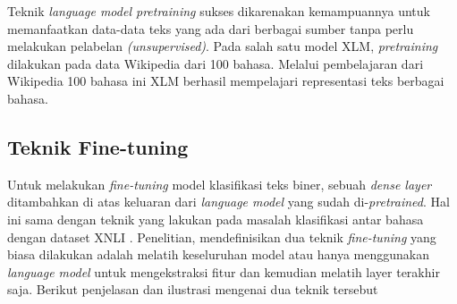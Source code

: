     Teknik \textit{language model pretraining} sukses dikarenakan kemampuannya untuk memanfaatkan data-data teks yang ada dari berbagai sumber tanpa perlu melakukan pelabelan \textit{(unsupervised)}. Pada salah satu model XLM, \textit{pretraining} dilakukan pada data Wikipedia dari 100 bahasa. Melalui pembelajaran dari Wikipedia 100 bahasa ini XLM berhasil mempelajari representasi teks berbagai bahasa.

	\subsection{Teknik Fine-tuning}
	Untuk melakukan \textit{fine-tuning} model klasifikasi teks biner, sebuah \textit{dense layer} ditambahkan di atas keluaran dari \textit{language model} yang sudah di-\textit{pretrained}. Hal ini sama dengan teknik yang \parencite{LampleConneau2019} lakukan pada masalah klasifikasi antar bahasa dengan dataset XNLI \parencite{Conneau_Rinott_Lample_Williams_Bowman_Schwenk_Stoyanov_2018}. Penelitian, \parencite{Devlin_Chang_Lee_Toutanova_2019} mendefinisikan dua teknik \textit{fine-tuning} yang biasa dilakukan adalah melatih keseluruhan model atau hanya menggunakan \textit{language model} untuk mengekstraksi fitur dan kemudian melatih layer terakhir saja. Berikut penjelasan dan ilustrasi mengenai dua teknik tersebut

